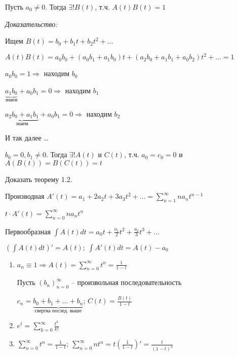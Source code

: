 \documentclass[12pt]{article}
\begin{document}
\newpage

\begin{theo}{}
    Пусть $a_0 \neq 0$. Тогда $\exists! B(t)$, т.ч. $A(t) B(t) = 1$
\end{theo}

\textit{Доказательство:}

Ищем $B(t) = b_0 + b_1t + b_2t^2 + \ldots$

$A(t)B(t) = a_0b_0 + (a_0b_1 + a_1b_0)t + (a_2b_0 + a_1b_1 + a_0b_2)t^2 + \ldots = 1$

$a_0b_0 = 1 \Rightarrow$ находим $b_0$

$\underbrace{a_1b_0}_\text{знаем} + a_0b_1 = 0 \Rightarrow$ находим $b_1$

$\underbrace{a_2b_0 + a_1b_1}_\text{знаем} + a_0b_1 = 0 \Rightarrow$ находим $b_2$

И так далее \dots

\begin{theo}{}
    $b_0 = 0, b_1 \neq 0$. Тогда $\exists! A(t)$ и $C(t)$, т.ч. $a_0 = c_0 = 0$ и $A(B(t)) = B(C(t)) = t$
\end{theo}

\begin{Exercise}{}
    Доказать теорему 1.2.
\end{Exercise}

\begin{defin}{Производная}
    $A'(t) = a_1 + 2a_2t + 3a_3t^2 + \ldots = \sum\limits_{n = 1}^\infty na_nt^{n - 1}$

    $t \cdot A'(t) = \sum\limits_{n = 0}^\infty na_nt^n$
\end{defin}

\begin{defin}{Первообразная}
    $\int A(t)dt = a_0t + \frac{a_1}{2}t^2 + \frac{a_2}{3}t^3 + \ldots$
\end{defin}

\begin{Remark}{}
    $(\int A(t)dt)' = A(t);\ \int A'(t)dt = A(t) - a_0$
\end{Remark}

\begin{Example}{}
    \begin{enumerate}
        \item $a_n \equiv 1 \Rightarrow A(t) = \sum\limits_{n = 0}^\infty t^n = \frac{1}{1 - t}$
        
        Пусть $(b_n)_{n = 0}^\infty$ -- произвольная последовательность

        $c_n = \underbrace{b_0 + b_1 + \ldots + b_n}_\text{свертка послед. выше}$; $C(t) = \frac{B(t)}{1 - t}$

        \item $e^t = \sum\limits_{k = 0}^\infty \frac{t^k}{k!}$
        \item $\sum\limits_{n = 0}^\infty t^n = \frac{1}{1 - t};\ \sum\limits_{n = 0}^\infty nt^n = t(\frac{1}{1 - t})' = \frac{t}{(1 - t)^2}$
    \end{enumerate}
\end{Example}
\end{document}
